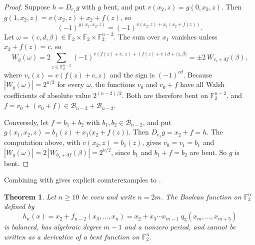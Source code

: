 \documentclass{amsart}
\numberwithin{equation}{section}
\theoremstyle{plain}
\newtheorem{theorem}[equation]{Theorem}
\theoremstyle{definition}
\theoremstyle{remark}
\newcommand{\F}{\mathbb{F}_2}
\newcommand{\B}{\mathcal{B}}
\newcommand{\ip}[2]{\langle #1,#2\rangle}
\begin{document}
\begin{proof}
Suppose $h=D_{e_1}g$ with $g$ bent, and put $v(x_2,z)=g(0,x_2,z)$.
Then $g(1,x_2,z)=v(x_2,z)+x_2+f(z)$, so
\[
 (-1)^{g(x_1,x_2,z)}=(-1)^{v(x_2,z)+x_1(x_2+f(z))}.
\]
Let $\omega=(c,d,\beta)\in\F\times\F\times\F^{n-2}$. The sum over
$x_1$ vanishes unless $x_2+f(z)=c$, so
\[
 W_g(\omega)
 =2\sum_{z\in\F^{n-2}}
   (-1)^{v(f(z)+c,\,z)+(f(z)+c)d+\ip{z}{\beta}}
 =\pm 2\,W_{v_c+df}(\beta),
\]
where $v_c(z)=v(f(z)+c,z)$ and the sign is $(-1)^{cd}$.
Because $|W_g(\omega)|=2^{n/2}$ for every $\omega$, the functions $v_0$
and $v_0+f$ have all Walsh coefficients of absolute value
$2^{(n-2)/2}$. Both are therefore bent on $\F^{n-2}$, and
$f=v_0+(v_0+f)\in\B_{n-2}+\B_{n-2}$.

Conversely, let $f=b_1+b_2$ with $b_1,b_2\in\B_{n-2}$, and put
$g(x_1,x_2,z)=b_1(z)+x_1\bigl(x_2+f(z)\bigr)$. Then
$D_{e_1}g=x_2+f=h$. The computation above, with
$v(x_2,z)=b_1(z)$, gives $v_0=v_1=b_1$ and
$|W_g(\omega)|=2\,|W_{b_1+df}(\beta)|=2^{n/2}$, since $b_1$ and
$b_1+f=b_2$ are bent. So $g$ is bent.
\end{proof}

Combining  with  gives explicit counterexamples to .

\begin{theorem}
\label{thm:derivative}
Let $n\ge 10$ be even and write $n=2m$. The Boolean function on $\F^n$ defined by
\begin{equation}
 \label{eq:hn}
 h_n(x)
  =x_2+f_{n-2}(x_3,\ldots,x_n)
  =x_2+x_3\cdots x_{m-1}\;q_3(x_m,\ldots,x_{m+5})
\end{equation}
is balanced, has algebraic degree $m-1$ and a nonzero period,
and cannot be written as a derivative of a bent function on $\F^n$.
\end{theorem}
\end{document}
